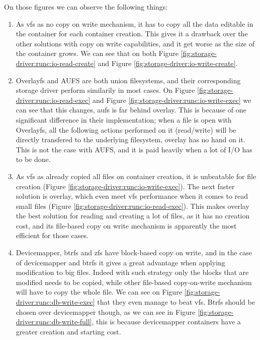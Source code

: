On those figures we can observe the following things:
\begin{enumerate}
  \item As vfs as no copy on write mechanism, it has to copy all the data editable in the container for each container creation.  This gives it a drawback over the other solutions with copy on write capabilities, and it get worse as the size of the container grows.  We can see that on both Figure \ref{fig:storage-driver:runc:io-read-create} and Figure \ref{fig:storage-driver:io-write-create}.
  \item Overlayfs and AUFS are both union filesystems, and their corresponding storage driver perform similarily in most cases.  On Figure \ref{fig:storage-driver:runc:io-read-exec} and Figure \ref{fig:storage-driver:runc:io-write-exec} we can see that this changes, aufs is far behind overlay.  This is because of one significant difference in their implementation; when a file is open with Overlayfs, all the following actions performed on it (read/write) will be directly transfered to the underlying filesystem, overlay has no hand on it.  This is not the case with AUFS, and it is paid heavily when a lot of I/O has to be done.
  \item As vfs as already copied all files on container creation, it is unbeatable for file creation (Figure \ref{fig:storage-driver:runc:io-write-exec}).  The next faster solution is overlay, which even meet vfs performance when it comes to read small files (Figure \ref{fig:storage-driver:runc:io-read-exec}).  This makes overlay the best solution for reading and creating a lot of files, as it has no creation cost, and its file-based copy on write mechanism is apparently the most efficient for those cases.
  \item Devicemapper, btrfs and zfs have block-based copy on write, and in the case of devicemapper and btrfs it gives a great advantage when applying modification to big files.  Indeed with such strategy only the blocks that are modified needs to be copied, while other file-based copy-on-write mechanism will have to copy the whole file.  We can see on Figure \ref{fig:storage-driver:runc:db-write-exec} that they even manage to beat vfs.  Btrfs should be chosen over devicemapper though, as we can see in Figure \ref{fig:storage-driver:runc:db-write-full}, this is because devicemapper containers have a greater creation and starting cost.
\end{enumerate}



